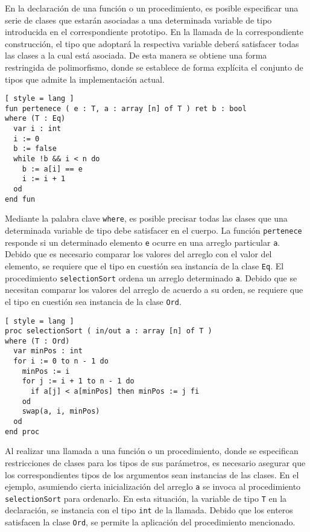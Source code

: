En la declaración de una función o un procedimiento, es posible especificar una serie de clases que estarán asociadas a una determinada variable de tipo introducida en el correspondiente prototipo.
En la llamada de la correspondiente construcción, el tipo que adoptará la respectiva variable deberá satisfacer todas las clases a la cual está asociada.
De esta manera se obtiene una forma restringida de polimorfismo, donde se establece de forma explícita el conjunto de tipos que admite la implementación actual.

\begin{lstlisting}[ style = lang ]
fun pertenece ( e : T, a : array [n] of T ) ret b : bool
where (T : Eq)
  var i : int
  i := 0
  b := false
  while !b && i < n do
    b := a[i] == e
    i := i + 1
  od
end fun
\end{lstlisting}

Mediante la palabra clave \lstinline[style = lang]{where}, es posible precisar todas las clases que una determinada variable de tipo debe satisfacer en el cuerpo.
La función \lstinline[style = lang]{pertenece} responde si un determinado elemento \lstinline[style = lang]{e} ocurre en una arreglo particular \lstinline[style = lang]{a}.
Debido que es necesario comparar los valores del arreglo con el valor del elemento, se requiere que el tipo en cuestión sea instancia de la clase \lstinline[style = lang]{Eq}.
El procedimiento \lstinline[style = lang]{selectionSort} ordena un arreglo determinado \lstinline[style = lang]{a}.
Debido que se necesitan comparar los valores del arreglo de acuerdo a su orden, se requiere que el tipo en cuestión sea instancia de la clase \lstinline[style = lang]{Ord}.

\begin{lstlisting}[ style = lang ]
proc selectionSort ( in/out a : array [n] of T )
where (T : Ord)
  var minPos : int
  for i := 0 to n - 1 do
    minPos := i
    for j := i + 1 to n - 1 do
      if a[j] < a[minPos] then minPos := j fi
    od
    swap(a, i, minPos)
  od
end proc
\end{lstlisting}
\fi

\iffalse
Al realizar una llamada a una función o un procedimiento, donde se especifican restricciones de clases para los tipos de sus parámetros, es necesario asegurar que los correspondientes tipos de los argumentos sean instancias de las clases.
En el ejemplo, asumiendo cierta inicialización del arreglo \lstinline[style = lang]{a} se invoca al procedimiento \lstinline[style = lang]{selectionSort} para ordenarlo.
En esta situación, la variable de tipo \lstinline[style = lang]{T} en la declaración, se instancia con el tipo \lstinline[style = lang]{int} de la llamada.
Debido que los enteros satisfacen la clase \lstinline[style = lang]{Ord}, se permite la aplicación del procedimiento mencionado.

